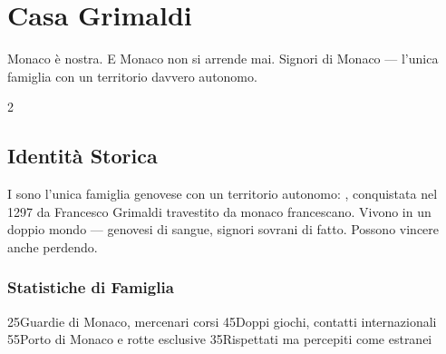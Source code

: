 \chapter{Casa Grimaldi}
\label{ch:grimaldi}


%
  {Monaco è nostra. E Monaco non si arrende mai.}%
  {Signori di Monaco — l'unica famiglia con un territorio davvero autonomo.}

\begin{multicols}{2}

\section{Identità Storica}
\label{sec:grimaldi-identita}

I  sono l'unica famiglia genovese con un territorio autonomo:
, conquistata nel 1297 da Francesco Grimaldi travestito da monaco
francescano. Vivono in un doppio mondo — genovesi di sangue, signori sovrani
di fatto. Possono vincere anche perdendo.

\columnbreak

\subsection{Statistiche di Famiglia}


     {2}{5}{Guardie di Monaco, mercenari corsi}
   {4}{5}{Doppi giochi, contatti internazionali}
 {5}{5}{Porto di Monaco e rotte esclusive}
 {3}{5}{Rispettati ma percepiti come estranei}

\end{multicols}

